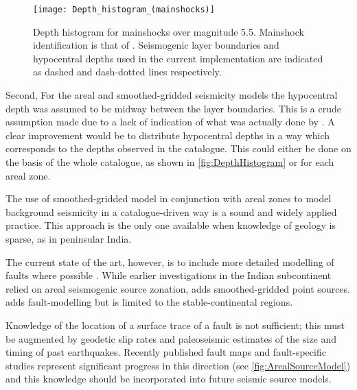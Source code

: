 \documentclass{article}
\begin{document}
\begin{appendices}
\begin{figure}
\begin{adjustbox}{center}
\texttt{[image: Depth\_histogram\_(mainshocks)]}
\end{adjustbox}
\caption[Depth histogram for mainshocks]{Depth histogram for mainshocks over magnitude 5.5.
Mainshock identification is that of \cite{nath2010earthquake}.
Seismogenic layer boundaries and hypocentral depths used in the current implementation are indicated as dashed and dash-dotted lines respectively.}
\label{fig:DepthHistogram}
\end{figure}

Second, For the areal and smoothed-gridded seismicity models the hypocentral depth was assumed to be midway between the layer boundaries.
This is a crude assumption made due to a lack of indication of what was actually done by \cite{nath2012probabilistic}.
A clear improvement would be to distribute hypocentral depths in a way which corresponds to the depths observed in the catalogue.
This could either be done on the basis of the whole catalogue, as shown in \autoref{fig:DepthHistogram} or for each areal zone.

The use of smoothed-gridded model in conjunction with areal zones to model background seismicity in a catalogue-driven way is a sound and widely applied practice. 
This approach is the only one available when knowledge of geology is sparse, as in peninsular India.

The current state of the art, however, is to include more detailed modelling of faults where possible 
\citep[e.g.][]{woessner2015european,petersen2014documentation}.
While earlier investigations in the Indian subcontinent \citep{bhatia1999probabilistic, Das2006, Yadav2008, jaiswal2007} relied on areal seismogenic source zonation, \cite{nath2012probabilistic} adds smoothed-gridded point sources.
\cite{ashish2016probabilistic} adds fault-modelling but is limited to the stable-continental regions.

Knowledge of the location of a surface trace of a fault is not sufficient; this must be augmented by geodetic slip rates and paleoseismic estimates of the size and timing of past earthquakes.
Recently published fault maps \citep{styron2010database, berryman2014himalayan} and fault-specific studies \citep{bilham2001plateau, hayes2012slab1} represent significant progress in this direction (see \autoref{fig:ArealSourceModel}) and this knowledge should be incorporated into future seismic source models.


\end{appendices}
\end{document}
